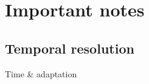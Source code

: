 \documentclass{article}
\begin{document}
\section{Important notes}
\subsection{Temporal resolution}
Time \& adaptation
\end{document}
